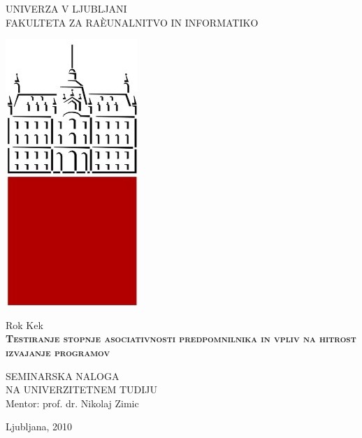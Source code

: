 \documentclass[12pt,a4paper,openany]{book}
\begin{document}
\thispagestyle{empty} 

\begin{center}
{\large 
UNIVERZA V LJUBLJANI\\
FAKULTETA ZA RAÈUNALNITVO IN INFORMATIKO\\
}

 \includegraphics[scale=0.2,keepaspectratio=true]{./pictures/uni_logo.png}

\vspace{1.5cm}
{\LARGE Rok Kek}\\

\vspace{2cm}
\textsc{\textbf{\LARGE 
Testiranje stopnje asociativnosti predpomnilnika
in vpliv na hitrost izvajanje programov\\ 
}}

\vspace{2cm}
{ SEMINARSKA NALOGA}\\
{ NA UNIVERZITETNEM TUDIJU }\\

\vspace{2cm} 
{\Large Mentor: prof. dr. Nikolaj Zimic}

\vfill
{\Large Ljubljana, 2010}
\end{center}

\newpage


\renewcommand\thepage{} 
\tableofcontents 
\renewcommand\thepage{\arabic{page}}

\thispagestyle{empty}
\end{document}
